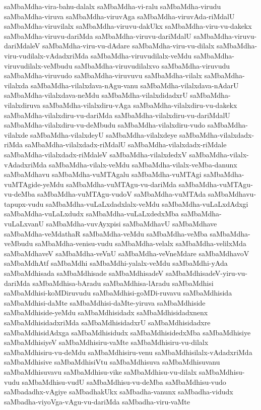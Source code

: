 {saMbaMdha-vira-bahu-dalalx
saMbaMdha-vi-ralu
saMbaMdha-virudu
saMbaMdha-viruva
saMbaMdha-viruvAga
saMbaMdha-viruvAda-riMdalU
saMbaMdha-viruvilalx
saMbaMdha-viruvu-dakUkx
saMbaMdha-viru-vu-dakekx
saMbaMdha-viruvu-dariMda
saMbaMdha-viruvu-dariMdalU
saMbaMdha-viruvu-dariMdaleV
saMbaMdha-viru-vu-dAdare
saMbaMdha-viru-vu-dilalx
saMbaMdha-viru-vudilalx-vAdadxriMda
saMbaMdha-viruvudilalx-veMdu
saMbaMdha-viruvudilalx-veMbudu
saMbaMdha-viruvudilalxvo
saMbaMdha-viruvudu
saMbaMdha-viruvudo
saMbaMdha-viruvuvu
saMbaMdha-vilalx
saMbaMdha-vilalxda
saMbaMdha-vilalxdava-nAgu-vanu
saMbaMdha-vilalxdava-nAdarU
saMbaMdha-vilalxdava-neMdu
saMbaMdha-vilalxdidadxrU
saMbaMdha-vilalxdiruva
saMbaMdha-vilalxdiru-vAga
saMbaMdha-vilalxdiru-vu-dakekx
saMbaMdha-vilalxdiru-vu-dariMda
saMbaMdha-vilalxdiru-vu-dariMdalU
saMbaMdha-vilalxdiru-vu-deMbudu
saMbaMdha-vilalxdiru-vudo
saMbaMdha-vilalxde
saMbaMdha-vilalxdeyU
saMbaMdha-vilalxdeye
saMbaMdha-vilalxdadx-riMda
saMbaMdha-vilalxdadx-riMdalU
saMbaMdha-vilalxdadx-riMdale
saMbaMdha-vilalxdadx-riMdaleV
saMbaMdha-vilalxdedxV
saMbaMdha-vilalx-vAdadxriMda
saMbaMdha-vilalx-veMdu
saMbaMdha-vilalx-veMba-danunx
saMbaMdhavu
saMbaMdha-vuMTAgalu
saMbaMdha-vuMTAgi
saMbaMdha-vuMTAgide-yeMdu
saMbaMdha-vuMTAgu-vu-dariMda
saMbaMdha-vuMTAgu-vu-deMba
saMbaMdha-vuMTAgu-vudoV
saMbaMdha-vuMTAda
saMbaMdhavu-tapupx-vudu
saMbaMdha-vuLaLxdadxlalx-veMdu
saMbaMdha-vuLaLxdAdxgi
saMbaMdha-vuLaLxdudx
saMbaMdha-vuLaLxdedxMba
saMbaMdha-vuLaLxvanU
saMbaMdha-vuvAyxpisi
saMbaMdhavU
saMbaMdhave
saMbaMdha-veMdathaR
saMbaMdha-veMdu
saMbaMdha-veMba
saMbaMdha-veMbudu
saMbaMdha-venisu-vudu
saMbaMdha-velalx
saMbaMdha-velilxMda
saMbaMdhaveV
saMbaMdha-veVnU
saMbaMdha-veVneMdare
saMbaMdhavoV
saMbaMdhAtf
saMbaMdhi
saMbaMdhi-yalalx-veMdu
saMbaMdhi-yAda
saMbaMdhisada
saMbaMdhisade
saMbaMdhisadeV
saMbaMdhisadeV-yiru-vu-dariMda
saMbaMdhisa-bAradu
saMbaMdhisa-lAradu
saMbaMdhisi
saMbaMdhisi-koMDiruvudu
saMbaMdhisi-goMDi-ruvavu
saMbaMdhisida
saMbaMdhisi-daMte
saMbaMdhisi-daMte-yiruva
saMbaMdhiside
saMbaMdhiside-yeMdu
saMbaMdhisidadx
saMbaMdhisidadxnenx
saMbaMdhisidadxriMda
saMbaMdhisidadxrU
saMbaMdhisidadxre
saMbaMdhisidAdxga
saMbaMdhisidudx
saMbaMdhisidedxMba
saMbaMdhisiye
saMbaMdhisiyeV
saMbaMdhisiru-vaMte
saMbaMdhisiru-vu-dilalx
saMbaMdhisiru-vu-deMdu
saMbaMdhisiru-venu
saMbaMdhisilalx-vAdadxriMda
saMbaMdhisive
saMbaMdhisiVtu
saMbaMdhisuva
saMbaMdhisuvanu
saMbaMdhisuvavu
saMbaMdhisu-vike
saMbaMdhisu-vu-dilalx
saMbaMdhisu-vudu
saMbaMdhisu-vudU
saMbaMdhisu-vu-deMba
saMbaMdhisu-vudo
saMbadadhx-vAgiye
saMbadhakUkx
saMbadha-vanunx
saMbadha-vidudx
saMbadha-viyoVga-vAgu-vu-dariMda
saMbadha-viru-vaMte
}
